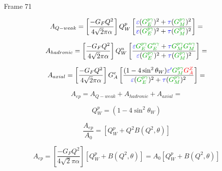 \documentclass[xcolor=x11names,compress,8pt]{beamer}
\renewcommand{\(}{\begin{columns}}
\renewcommand{\)}{\end{columns}}
\newcommand{\<}[1]{\begin{column}{#1}}
\renewcommand{\>}{\end{column}}
\begin{document}
\begin{frame}{Frame 71}

\fontsize{6pt}{7.2}\selectfont

\begin{equation} \label{equ:qweak5}
A_{Q-weak} = \left[ \frac{-G_{F}Q^{2}}{4 \sqrt{2}\pi\alpha} \right] Q_{W}^{p}\left[ \frac{\textcolor{blue}{\varepsilon}(\textcolor{darkgreen}{G_{E}^{p\gamma}})^{2} + \textcolor{blue}{\tau}(\textcolor{darkgreen}{G_{M}^{p\gamma}})^{2} }{ \textcolor{blue}{\varepsilon}(\textcolor{darkgreen}{G_{E}^{p\gamma}})^{2} + \textcolor{blue}{\tau}(\textcolor{darkgreen}{G_{M}^{p\gamma}})^{2} } \right] = 
\end{equation}

\begin{equation} \label{equ:qweak5}
A_{hadronic} = \left[ \frac{-G_{F}Q^{2}}{4 \sqrt{2}\pi\alpha} \right] Q_{W}^{n}\left[\frac{\textcolor{blue}{\varepsilon}\textcolor{darkgreen}{G_{E}^{p\gamma}}\textcolor{darkgreen}{G_{E}^{n\gamma}} + \textcolor{blue}{\tau}\textcolor{darkgreen}{G_{M}^{p\gamma}}\textcolor{darkgreen}{G_{M}^{n\gamma}} }{ \textcolor{blue}{\varepsilon}(\textcolor{darkgreen}{G_{E}^{p\gamma}})^{2} + \textcolor{blue}{\tau}(\textcolor{darkgreen}{G_{M}^{p\gamma}})^{2} } \right] = 
\end{equation}

\begin{equation} \label{equ:qweak5}
A_{axial} = \left[ \frac{-G_{F}Q^{2}}{4 \sqrt{2}\pi\alpha} \right] G_{A}^{e}\left[\frac{(1-4\sin^{2}\theta_{W})\textcolor{blue}{\varepsilon^{\prime}}\textcolor{darkgreen}{G_{M}^{p\gamma}}\textcolor{red}{G_{A}^{Z}} }{ \textcolor{blue}{\varepsilon}(\textcolor{darkgreen}{G_{E}^{p\gamma}})^{2} + \textcolor{blue}{\tau}(\textcolor{darkgreen}{G_{M}^{p\gamma}})^{2} } \right] = 
\end{equation}

\begin{equation} \label{equ:qweak51}
A_{ep} = A_{Q-weak}  + A_{hadronic}  + A_{axial} = 
\end{equation}

\begin{equation} \label{equ:qweak51}
Q_{W}^{p} = (1-4\sin^{2}\theta_{W}) 
\end{equation}

\begin{equation} \label{equ:qweak51}
\frac{A_{ep}}{A_{0}} = \left[ Q_{W}^{p} + Q^{2} B(Q^{2}, \theta) \right]
\end{equation}

\begin{equation} \label{equ:qweak3}
A_{ep} = \left[ \frac{-G_{F}Q^{2}}{4 \sqrt{2}\pi\alpha} \right] \left[ Q_{W}^{p} + B(Q^{2}, \theta) \right] = A_{0} \left[ Q_{W}^{p} + B(Q^{2}, \theta) \right]
\end{equation}


\end{frame}
\end{document}
